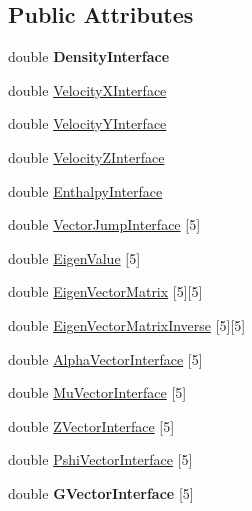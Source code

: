 \subsection*{Public Attributes}
\begin{DoxyCompactItemize}
\item 
double {\bfseries Density\+Interface}\hypertarget{classinterface_a5a0a592bdfe7f5987c2c4f4424fbccd9}{}\label{classinterface_a5a0a592bdfe7f5987c2c4f4424fbccd9}

\item 
double \hyperlink{classinterface_afae6ebb7814474f2264759a14521f448}{Velocity\+X\+Interface}
\item 
double \hyperlink{classinterface_a0f42e6e3fd259e9fc191a255a6650ef6}{Velocity\+Y\+Interface}
\item 
double \hyperlink{classinterface_a1f1cc4570519d23fc38414472d7721f9}{Velocity\+Z\+Interface}
\item 
double \hyperlink{classinterface_af2f6d43336396abc20bd88521e489a71}{Enthalpy\+Interface}
\item 
double \hyperlink{classinterface_aa99760e0d73f30c6f1541414efc76f87}{Vector\+Jump\+Interface} \mbox{[}5\mbox{]}
\item 
double \hyperlink{classinterface_a6e63abc816f019315477dc514963c505}{Eigen\+Value} \mbox{[}5\mbox{]}
\item 
double \hyperlink{classinterface_a5889dedb2a24917fa46bd4c6515a33c7}{Eigen\+Vector\+Matrix} \mbox{[}5\mbox{]}\mbox{[}5\mbox{]}
\item 
double \hyperlink{classinterface_ae67dd839deeeacfb620b114c560ea0a5}{Eigen\+Vector\+Matrix\+Inverse} \mbox{[}5\mbox{]}\mbox{[}5\mbox{]}
\item 
double \hyperlink{classinterface_aa3f54ad5bd8d3081383f2190090b4109}{Alpha\+Vector\+Interface} \mbox{[}5\mbox{]}
\item 
double \hyperlink{classinterface_aa740f1171fcddcb604c237cabbcebc1a}{Mu\+Vector\+Interface} \mbox{[}5\mbox{]}
\item 
double \hyperlink{classinterface_a32902e62056c2479ade3f78167f1522f}{Z\+Vector\+Interface} \mbox{[}5\mbox{]}
\item 
double \hyperlink{classinterface_a37044e7a6a8820ea4bcbcaf969628238}{Pshi\+Vector\+Interface} \mbox{[}5\mbox{]}
\item 
double {\bfseries G\+Vector\+Interface} \mbox{[}5\mbox{]}\hypertarget{classinterface_ab25dbd2f7aaa6921fd5edb973af98ed4}{}\label{classinterface_ab25dbd2f7aaa6921fd5edb973af98ed4}

\end{DoxyCompactItemize}


